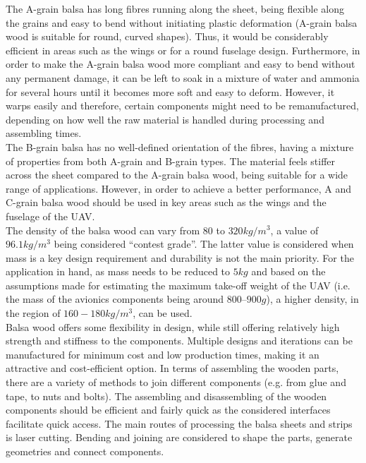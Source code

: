 \documentclass[12pt]{article}
\begin{document}
\noindent The A-grain balsa has long fibres running along the sheet, being flexible along the grains and easy to bend without initiating plastic deformation (A-grain balsa wood is suitable for round, curved shapes). Thus, it would be considerably efficient in areas such as the wings or for a round fuselage design. Furthermore, in order to make the A-grain balsa wood more compliant and easy to bend without any permanent damage, it can be left to soak in a mixture of water and ammonia for several hours until it becomes more soft and easy to deform. However, it warps easily and therefore, certain components might need to be remanufactured, depending on how well the raw material is handled during processing and assembling times. \cite{BALSAREF} \\

\noindent The B-grain balsa has no well-defined orientation of the fibres, having a mixture of properties from both A-grain and B-grain types. The material feels stiffer across the sheet compared to the A-grain balsa wood, being suitable for a wide range of applications. However, in order to achieve a better performance, A and C-grain balsa wood should be used in key areas such as the wings and the fuselage of the UAV. \\

\noindent The density of the balsa wood can vary from $80$ to $320kg/m^3$, a value of $96.1kg/m^3$ being considered “contest grade”. The latter value is considered when mass is a key design requirement and durability is not the main priority. For the application in hand, as mass needs to be reduced to $5kg$ and based on the assumptions made for estimating the maximum take-off weight of the UAV (i.e. the mass of the avionics components being around $800 – 900g$), a higher density, in the region of $160 - 180kg/m^3$, can be used. \cite{BALSAREF} \\

\noindent Balsa wood offers some flexibility in design, while still offering relatively high strength and stiffness to the components. Multiple designs and iterations can be manufactured for minimum cost and low production times, making it an attractive and cost-efficient option. In terms of assembling the wooden parts, there are a variety of methods to join different components (e.g. from glue and tape, to nuts and bolts). The assembling and disassembling of the wooden components should be efficient and fairly quick as the considered interfaces facilitate quick access. The main routes of processing the balsa sheets and strips is laser cutting. Bending and joining are considered to shape the parts, generate geometries and connect components.\\
\end{document}
